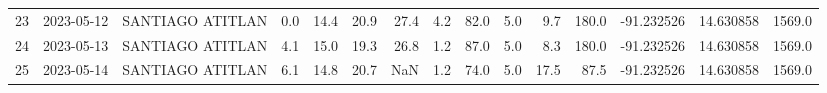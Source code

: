 \documentclass[12pt]{article}
\begin{document}
\begin{center}
\begin{tabular}{lllrrrrrrrrrrrr}
23  & 2023-05-12 &  SANTIAGO ATITLAN &     0.0 &  14.4 &   20.9 &  27.4 &      4.2 &     82.0 &  5.0 &         9.7 &       180.0 & -91.232526 &  14.630858 &   1569.0 \\
24  & 2023-05-13 &  SANTIAGO ATITLAN &     4.1 &  15.0 &   19.3 &  26.8 &      1.2 &     87.0 &  5.0 &         8.3 &       180.0 & -91.232526 &  14.630858 &   1569.0 \\
25  & 2023-05-14 &  SANTIAGO ATITLAN &     6.1 &  14.8 &   20.7 &   NaN &      1.2 &     74.0 &  5.0 &        17.5 &        87.5 & -91.232526 &  14.630858 &   1569.0 \\
\bottomrule
\end{tabular}

        
        \end{center}
        
\end{document}
